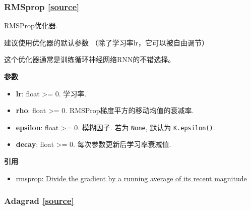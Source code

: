 \subsubsection{RMSprop {\href{https://github.com/keras-team/keras/blob/master/keras/optimizers.py\#L198}{{[}source{]}}}}

\begin{Shaded}
\begin{Highlighting}[]
\OperatorTok{=}\OperatorTok{=}\OperatorTok{=}\OperatorTok{=}\NormalTok{)}
\end{Highlighting}
\end{Shaded}

RMSProp优化器.

建议使用优化器的默认参数 （除了学习率lr，它可以被自由调节）

这个优化器通常是训练循环神经网络RNN的不错选择。

\textbf{参数}

\begin{itemize}
\tightlist
\item
  \textbf{lr}: float \textgreater{}= 0. 学习率.
\item
  \textbf{rho}: float \textgreater{}= 0.
  RMSProp梯度平方的移动均值的衰减率.
\item
  \textbf{epsilon}: float \textgreater{}= 0. 模糊因子. 若为
  \texttt{None}, 默认为 \texttt{K.epsilon()}.
\item
  \textbf{decay}: float \textgreater{}= 0. 每次参数更新后学习率衰减值.
\end{itemize}

\textbf{引用}

\begin{itemize}
\tightlist
\item
  \href{http://www.cs.toronto.edu/~tijmen/csc321/slides/lecture_slides_lec6.pdf}{rmsprop:
  Divide the gradient by a running average of its recent magnitude}
\end{itemize}




\subsubsection{Adagrad {\href{https://github.com/keras-team/keras/blob/master/keras/optimizers.py\#L265}{{[}source{]}}}}

\begin{Shaded}
\begin{Highlighting}[]
\OperatorTok{=}\OperatorTok{=}\OperatorTok{=}\NormalTok{)}
\end{Highlighting}
\end{Shaded}

